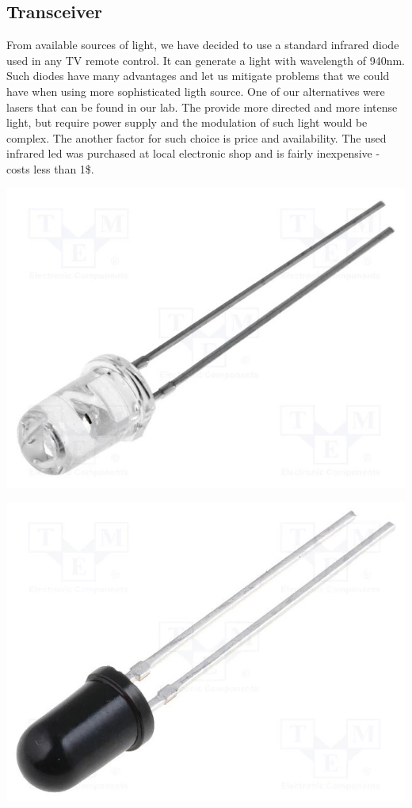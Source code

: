 \documentclass[12pt]{article}
\begin{document}
  \subsection{Transceiver}
  From available sources of light, we have decided to use a standard infrared diode used in any TV remote control. It can generate a light with wavelength of 940nm.
  Such diodes have many advantages and let us mitigate problems that we could have when using more sophisticated ligth source. One of our alternatives were lasers that
  can be found in our lab. The provide more directed and more intense light, but require power supply and the modulation of such light would be complex.
  The another factor for such choice is price and availability. The used infrared led was purchased at local electronic shop and is fairly inexpensive - costs less than 1\$.
  \begin{multicols}{2}
    \centering
    \includegraphics[scale=0.6]{ir_diode.jpg}
     \par
    \includegraphics[scale=0.6]{photodiode.jpg}
\end{multicols}
  
\end{document}

